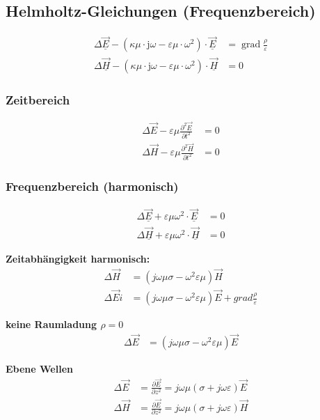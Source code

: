 \subsection{Helmholtz-Gleichungen (Frequenzbereich)}
\begin{align*}
    \Delta \underline{\vec{E}}-\left(\kappa \mu \cdot \mathrm{j} \omega-\varepsilon \mu \cdot \omega^{2}\right) \cdot \underline{\vec{E}} & = \operatorname{grad} \frac{\rho}{\varepsilon} \\
    \Delta \underline{\vec{H}}-\left(\kappa \mu \cdot \mathrm{j} \omega-\varepsilon \mu \cdot \omega^{2}\right) \cdot \underline{\vec{H}} & = 0
\end{align*}

\subsubsection{Zeitbereich}
\begin{align*}
    \Delta \vec{E}-\varepsilon \mu \frac{\partial^{2} \vec{E}}{\partial t^{2}} & =0 \\
    \Delta \vec{H}-\varepsilon \mu \frac{\partial^{2} \vec{H}}{\partial t^{2}} & =0
\end{align*}

\subsubsection{Frequenzbereich (harmonisch)}
\begin{align*}
    \Delta \underline{\vec{E}}+\varepsilon \mu \omega^{2} \cdot \underline{\vec{E}} & =0 \\
    \Delta \underline{\vec{H}}+\varepsilon \mu \omega^{2} \cdot \underline{\vec{H}} & =0
\end{align*}

\textbf{Zeitabhängigkeit harmonisch:}
\begin{align*}
    \Delta \vec{H}   & = (j \omega \mu \sigma - \omega^2 \varepsilon \mu ) \vec{H}                                  \\
    \Delta \vec{E} i & = (j \omega \mu \sigma - \omega^2 \varepsilon \mu ) \vec{E} + grad \frac{ \rho}{\varepsilon}
\end{align*}

\textbf{keine Raumladung $ \rho = 0$}
\begin{align*}
    \Delta \vec{E} & = (j \omega \mu \sigma - \omega^2 \varepsilon \mu ) \vec{E}
\end{align*}

\textbf{Ebene Wellen}
\begin{align*}
    \Delta \vec{E} & = \frac{ \partial \vec{E}}{ \partial z^2} = j \omega \mu ( \sigma + j \omega \varepsilon) \vec{E} \\
    \Delta \vec{H} & = \frac{ \partial \vec{E}}{ \partial z^2} = j \omega \mu ( \sigma + j \omega \varepsilon) \vec{H}
\end{align*}


